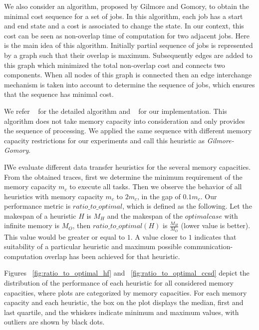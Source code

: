 \documentclass[runningheads]{llncs} %
\begin{document}
	We also consider an algorithm, proposed by Gilmore and Gomory, to obtain the minimal cost sequence for a set of jobs. In this algorithm, each job has a start and end state and a cost is associated to change the state. In our context, this cost can be seen as non-overlap time of computation for two adjacent jobs. Here is the main idea of this algorithm. Initially partial sequence of jobs is represented by a graph such that their overlap is maximum. Subsequently edges are added to this graph which minimized the total non-overlap cost  and connects two components. When all nodes of this graph is connected then an edge interchange mechanism is taken into account to determine the sequence of jobs, which ensures that the sequence has minimal cost.
	
	We refer ~\cite{Gilmore-Gomory:1964} for the detailed algorithm and ~\cite{gitworkrepo} for our implementation. This algorithm does not take memory capacity into consideration and only provides the sequence of processing. We applied the same sequence with different memory capacity restrictions for our experiments and call this heuristic as \textit{Gilmore-Gomory}.
	
	
	
	IWe evaluate different data transfer heuristics for the several memory capacities. From the obtained traces, first we determine the minimum requirement of the memory capacity $m_c$ to execute all tasks. Then we observe the behavior of all heuristics with memory capacity  $m_c$ to $2m_c$, in the gap of $0.1m_c$. Our performance metric is $ratio\_to\_optimal$, which is defined as the following. Let the makespan of a heuristic $H$ is $M_H$ and the makespan of the $optimal  case$ with infinite memory is $M_O$, then  $ratio\_to\_optimal (H)$ is $\frac{M_H}{M_O}$ (lower value is better). This value would be  greater or equal to $1$. A value closer to $1$ indicates that suitability of a particular heuristic and maximum possible communication-computation overlap has been achieved for that heuristic.
	
	
	Figures ~\ref{fig:ratio_to_optimal_hf} and ~\ref{fig:ratio_to_optimal_ccsd} depict the distribution of the performance  of each heuristic for all considered memory capacities, where plots are categorized by memory capacities. For each memory capacity and each heuristic, the box on the plot displays the median, first and last quartile, and the whiskers indicate minimum and maximum values, with outliers are shown by black dots.
\end{document}

